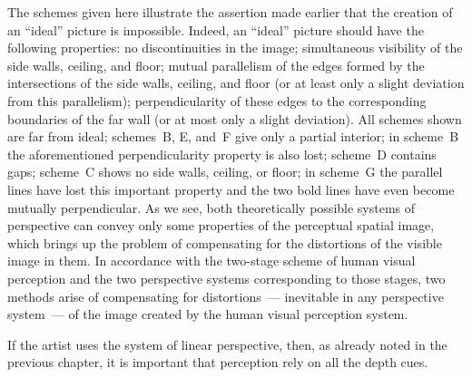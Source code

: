The schemes given here illustrate the assertion made earlier that the creation of an
``ideal'' picture is impossible.  Indeed, an ``ideal'' picture should have the following
properties: no discontinuities in the image; simultaneous visibility of the side walls,
ceiling, and floor; mutual parallelism of the edges formed by the intersections of the
side walls, ceiling, and floor (or at least only a slight deviation from this parallelism);
perpendicularity of these edges to the corresponding boundaries of the far wall (or at
most only a slight deviation).  All schemes shown are far from ideal; schemes~B, E,
and~F give only a partial interior; in scheme~B the aforementioned perpendicularity
property is also lost; scheme~D contains gaps; scheme~C shows no side walls, ceiling,
or floor; in scheme~G the parallel lines have lost this important property and the two
bold lines have even become mutually perpendicular.  As we see, both theoretically
possible systems of perspective can convey only some properties of the perceptual
spatial image, which brings up the problem of compensating for the distortions of the
visible image in them.  In accordance with the two-stage scheme of human visual
perception and the two perspective systems corresponding to those stages, two methods
arise of compensating for distortions~--- inevitable in any perspective system~--- of the
image created by the human visual perception system.

If the artist uses the system of linear perspective, then, as already noted in the previous
chapter, it is important that perception rely on all the depth cues.

